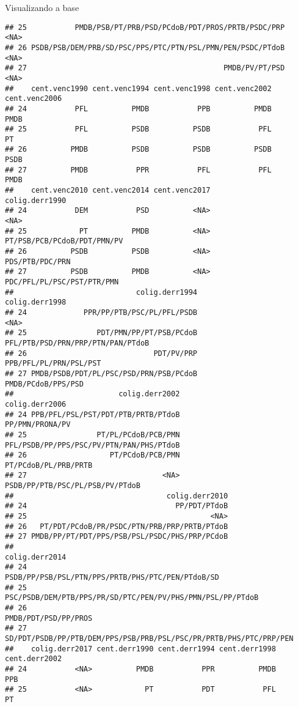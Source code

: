 \documentclass[
  10pt,
  ignorenonframetext,
]{beamer}
\begin{document}
\begin{frame}[fragile]{Visualizando a base}
\begin{verbatim}
## 25           PMDB/PSB/PT/PRB/PSD/PCdoB/PDT/PROS/PRTB/PSDC/PRP           <NA>
## 26 PSDB/PSB/DEM/PRB/SD/PSC/PPS/PTC/PTN/PSL/PMN/PEN/PSDC/PTdoB           <NA>
## 27                                             PMDB/PV/PT/PSD           <NA>
##    cent.venc1990 cent.venc1994 cent.venc1998 cent.venc2002 cent.venc2006
## 24           PFL          PMDB           PPB          PMDB          PMDB
## 25           PFL          PSDB          PSDB           PFL            PT
## 26          PMDB          PSDB          PSDB          PSDB          PSDB
## 27          PMDB           PPR           PFL           PFL          PMDB
##    cent.venc2010 cent.venc2014 cent.venc2017              colig.derr1990
## 24           DEM           PSD          <NA>                        <NA>
## 25            PT          PMDB          <NA> PT/PSB/PCB/PCdoB/PDT/PMN/PV
## 26          PSDB          PSDB          <NA>             PDS/PTB/PDC/PRN
## 27          PSDB          PMDB          <NA>  PDC/PFL/PL/PSC/PST/PTR/PMN
##                            colig.derr1994                    colig.derr1998
## 24             PPR/PP/PTB/PSC/PL/PFL/PSDB                              <NA>
## 25                PDT/PMN/PP/PT/PSB/PCdoB PFL/PTB/PSD/PRN/PRP/PTN/PAN/PTdoB
## 26                             PDT/PV/PRP            PPB/PFL/PL/PRN/PSL/PST
## 27 PMDB/PSDB/PDT/PL/PSC/PSD/PRN/PSB/PCdoB                PMDB/PCdoB/PPS/PSD
##                        colig.derr2002                           colig.derr2006
## 24 PPB/PFL/PSL/PST/PDT/PTB/PRTB/PTdoB                          PP/PMN/PRONA/PV
## 25                PT/PL/PCdoB/PCB/PMN PFL/PSDB/PP/PPS/PSC/PV/PTN/PAN/PHS/PTdoB
## 26                   PT/PCdoB/PCB/PMN                     PT/PCdoB/PL/PRB/PRTB
## 27                               <NA>          PSDB/PP/PTB/PSC/PL/PSB/PV/PTdoB
##                                   colig.derr2010
## 24                                  PP/PDT/PTdoB
## 25                                          <NA>
## 26   PT/PDT/PCdoB/PR/PSDC/PTN/PRB/PRP/PRTB/PTdoB
## 27 PMDB/PP/PT/PDT/PPS/PSB/PSL/PSDC/PHS/PRP/PCdoB
##                                                        colig.derr2014
## 24                  PSDB/PP/PSB/PSL/PTN/PPS/PRTB/PHS/PTC/PEN/PTdoB/SD
## 25         PSC/PSDB/DEM/PTB/PPS/PR/SD/PTC/PEN/PV/PHS/PMN/PSL/PP/PTdoB
## 26                                               PMDB/PDT/PSD/PP/PROS
## 27 SD/PDT/PSDB/PP/PTB/DEM/PPS/PSB/PRB/PSL/PSC/PR/PRTB/PHS/PTC/PRP/PEN
##    colig.derr2017 cent.derr1990 cent.derr1994 cent.derr1998 cent.derr2002
## 24           <NA>          PMDB           PPR          PMDB           PPB
## 25           <NA>            PT           PDT           PFL            PT

\end{verbatim}
\end{frame}
\end{document}

